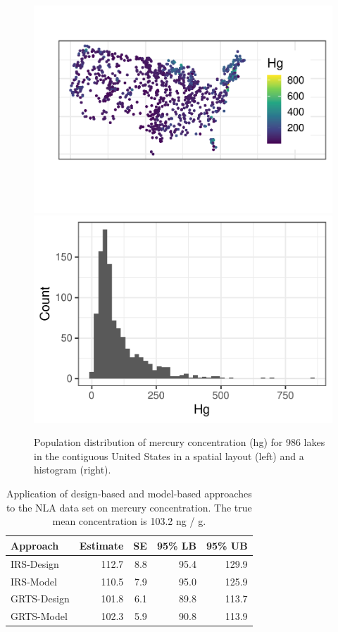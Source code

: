 \documentclass[]{elsarticle} %
\begin{document}
\begin{figure}

{\centering \includegraphics[width=0.49\linewidth]{manuscript_files/figure-latex/figdata-1} \includegraphics[width=0.49\linewidth]{manuscript_files/figure-latex/figdata-2} 

}

\caption{Population distribution of mercury concentration (hg) for 986 lakes in the contiguous United States in a spatial layout (left) and a histogram (right).}\label{fig:figdata}
\end{figure}

\begin{table}[ht]
\centering
\begin{tabular}{lrrrr}
  \hline
Approach & Estimate & SE & 95\% LB & 95\% UB \\ 
  \hline
IRS-Design & 112.7 & 8.8 & 95.4 & 129.9 \\ 
  IRS-Model & 110.5 & 7.9 & 95.0 & 125.9 \\ 
  GRTS-Design & 101.8 & 6.1 & 89.8 & 113.7 \\ 
  GRTS-Model & 102.3 & 5.9 & 90.8 & 113.9 \\ 
   \hline
\end{tabular}
\caption{\label{tab:appliedtab} Application of design-based and model-based approaches to the NLA data set on mercury concentration. The true mean concentration is 103.2 ng / g.} 
\end{table}
\end{document}
